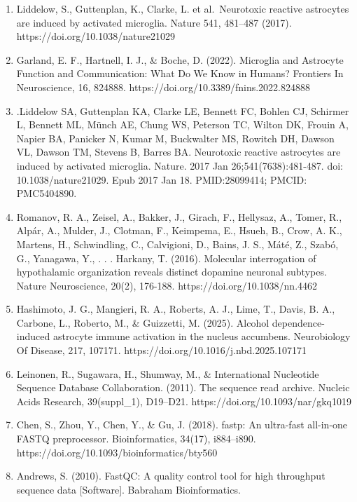 \documentclass[
  9pt,
]{article}
\newcounter{none} %
\begin{document}
\begin{enumerate}
\def\labelenumi{\arabic{enumi}.}
\item
  Liddelow, S., Guttenplan, K., Clarke, L. et al.~Neurotoxic reactive
  astrocytes are induced by activated microglia. Nature 541, 481--487
  (2017). https://doi.org/10.1038/nature21029
\item
  Garland, E. F., Hartnell, I. J., \& Boche, D. (2022). Microglia and
  Astrocyte Function and Communication: What Do We Know in Humans?
  Frontiers In Neuroscience, 16, 824888.
  https://doi.org/10.3389/fnins.2022.824888
\item
  .Liddelow SA, Guttenplan KA, Clarke LE, Bennett FC, Bohlen CJ,
  Schirmer L, Bennett ML, Münch AE, Chung WS, Peterson TC, Wilton DK,
  Frouin A, Napier BA, Panicker N, Kumar M, Buckwalter MS, Rowitch DH,
  Dawson VL, Dawson TM, Stevens B, Barres BA. Neurotoxic reactive
  astrocytes are induced by activated microglia. Nature. 2017 Jan
  26;541(7638):481-487. doi: 10.1038/nature21029. Epub 2017 Jan 18.
  PMID:28099414; PMCID: PMC5404890.
\item
  Romanov, R. A., Zeisel, A., Bakker, J., Girach, F., Hellysaz, A.,
  Tomer, R., Alpár, A., Mulder, J., Clotman, F., Keimpema, E., Hsueh,
  B., Crow, A. K., Martens, H., Schwindling, C., Calvigioni, D., Bains,
  J. S., Máté, Z., Szabó, G., Yanagawa, Y., . . . Harkany, T. (2016).
  Molecular interrogation of hypothalamic organization reveals distinct
  dopamine neuronal subtypes. Nature Neuroscience, 20(2), 176-188.
  https://doi.org/10.1038/nn.4462
\item
  Hashimoto, J. G., Mangieri, R. A., Roberts, A. J., Lime, T., Davis, B.
  A., Carbone, L., Roberto, M., \& Guizzetti, M. (2025). Alcohol
  dependence-induced astrocyte immune activation in the nucleus
  accumbens. Neurobiology Of Disease, 217, 107171.
  https://doi.org/10.1016/j.nbd.2025.107171
\item
  Leinonen, R., Sugawara, H., Shumway, M., \& International Nucleotide
  Sequence Database Collaboration. (2011). The sequence read archive.
  Nucleic Acids Research, 39(suppl\_1), D19--D21.
  https://doi.org/10.1093/nar/gkq1019
\item
  Chen, S., Zhou, Y., Chen, Y., \& Gu, J. (2018). fastp: An ultra-fast
  all-in-one FASTQ preprocessor. Bioinformatics, 34(17), i884--i890.
  https://doi.org/10.1093/bioinformatics/bty560
\item
  Andrews, S. (2010). FastQC: A quality control tool for high throughput
  sequence data {[}Software{]}. Babraham Bioinformatics.

\end{enumerate}
\end{document}
